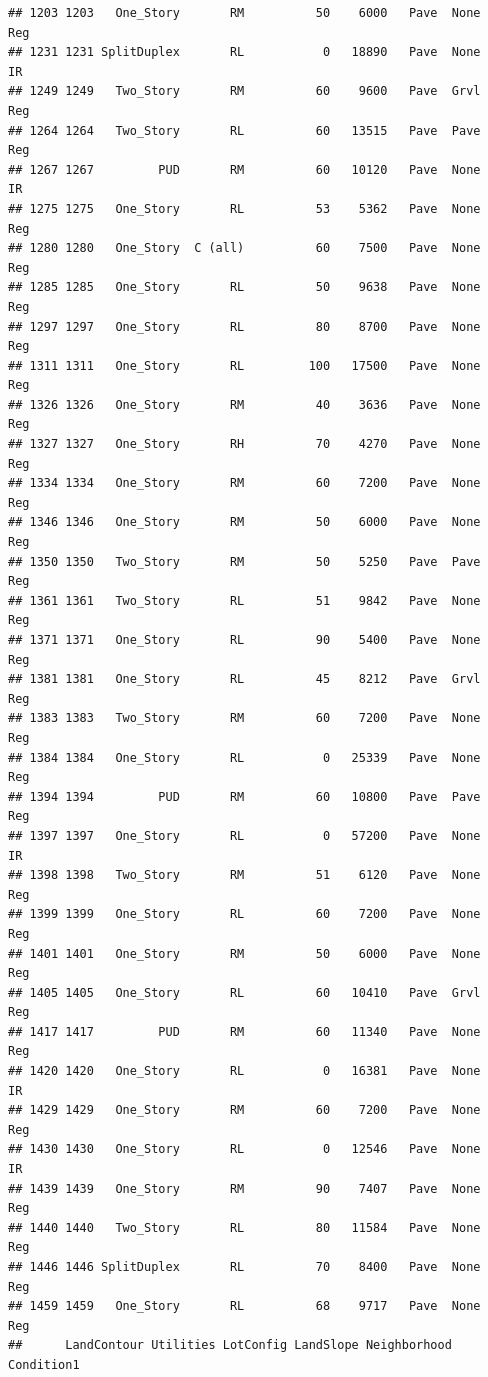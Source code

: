 \documentclass[]{article}
\begin{document}
\begin{verbatim}
## 1203 1203   One_Story       RM          50    6000   Pave  None      Reg
## 1231 1231 SplitDuplex       RL           0   18890   Pave  None       IR
## 1249 1249   Two_Story       RM          60    9600   Pave  Grvl      Reg
## 1264 1264   Two_Story       RL          60   13515   Pave  Pave      Reg
## 1267 1267         PUD       RM          60   10120   Pave  None       IR
## 1275 1275   One_Story       RL          53    5362   Pave  None      Reg
## 1280 1280   One_Story  C (all)          60    7500   Pave  None      Reg
## 1285 1285   One_Story       RL          50    9638   Pave  None      Reg
## 1297 1297   One_Story       RL          80    8700   Pave  None      Reg
## 1311 1311   One_Story       RL         100   17500   Pave  None      Reg
## 1326 1326   One_Story       RM          40    3636   Pave  None      Reg
## 1327 1327   One_Story       RH          70    4270   Pave  None      Reg
## 1334 1334   One_Story       RM          60    7200   Pave  None      Reg
## 1346 1346   One_Story       RM          50    6000   Pave  None      Reg
## 1350 1350   Two_Story       RM          50    5250   Pave  Pave      Reg
## 1361 1361   Two_Story       RL          51    9842   Pave  None      Reg
## 1371 1371   One_Story       RL          90    5400   Pave  None      Reg
## 1381 1381   One_Story       RL          45    8212   Pave  Grvl      Reg
## 1383 1383   Two_Story       RM          60    7200   Pave  None      Reg
## 1384 1384   One_Story       RL           0   25339   Pave  None      Reg
## 1394 1394         PUD       RM          60   10800   Pave  Pave      Reg
## 1397 1397   One_Story       RL           0   57200   Pave  None       IR
## 1398 1398   Two_Story       RM          51    6120   Pave  None      Reg
## 1399 1399   One_Story       RL          60    7200   Pave  None      Reg
## 1401 1401   One_Story       RM          50    6000   Pave  None      Reg
## 1405 1405   One_Story       RL          60   10410   Pave  Grvl      Reg
## 1417 1417         PUD       RM          60   11340   Pave  None      Reg
## 1420 1420   One_Story       RL           0   16381   Pave  None       IR
## 1429 1429   One_Story       RM          60    7200   Pave  None      Reg
## 1430 1430   One_Story       RL           0   12546   Pave  None       IR
## 1439 1439   One_Story       RM          90    7407   Pave  None      Reg
## 1440 1440   Two_Story       RL          80   11584   Pave  None      Reg
## 1446 1446 SplitDuplex       RL          70    8400   Pave  None      Reg
## 1459 1459   One_Story       RL          68    9717   Pave  None      Reg
##      LandContour Utilities LotConfig LandSlope Neighborhood Condition1

\end{verbatim}
\end{document}
